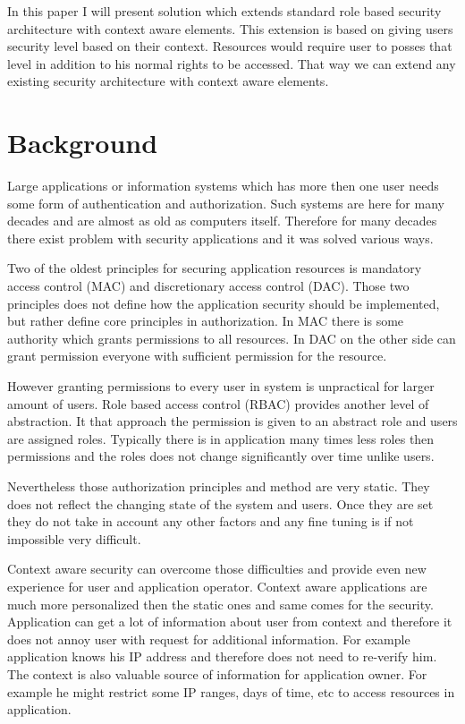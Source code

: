 \documentclass{poster15}
\begin{document}
In this paper I will present solution which extends standard role based security architecture with context aware elements. This extension is based on giving users security level based on their context. Resources would require user to posses that level in addition to his normal rights to be accessed. That way we can extend any existing security architecture with context aware elements.

\section{Background}

Large applications or information systems which has more then one user needs some form of authentication and authorization. Such systems are here for many decades and are almost as old as computers itself. Therefore for many decades there exist problem with security applications and it was solved various ways.

Two of the oldest principles for securing application resources is mandatory access control (MAC) and discretionary access control (DAC). Those two principles does not define how the application security should be implemented, but rather define core principles in authorization. In MAC there is some authority which grants permissions to all resources. In DAC on the other side can grant permission everyone with sufficient permission for the resource.

However granting permissions to every user in system is unpractical for larger amount of users. Role based access control (RBAC) provides another level of abstraction. It that approach the permission is given to an abstract role and users are assigned roles. Typically there is in application many times less roles then permissions and the roles does not change significantly over time unlike users.

Nevertheless those authorization principles and method are very static. They does not reflect the changing state of the system and users. Once they are set they do not take in account any other factors and any fine tuning is if not impossible very difficult.

Context aware security can overcome those difficulties and provide even new experience for user and application operator. Context aware applications are much more personalized then the static ones and same comes for the security. Application can get a lot of information about user from context and therefore it does not annoy user with request for additional information. For example application knows his IP address and therefore does not need to re-verify him. The context is also valuable source of information for application owner. For example he might restrict some IP ranges, days of time, etc to access resources in application. 
\end{document}
